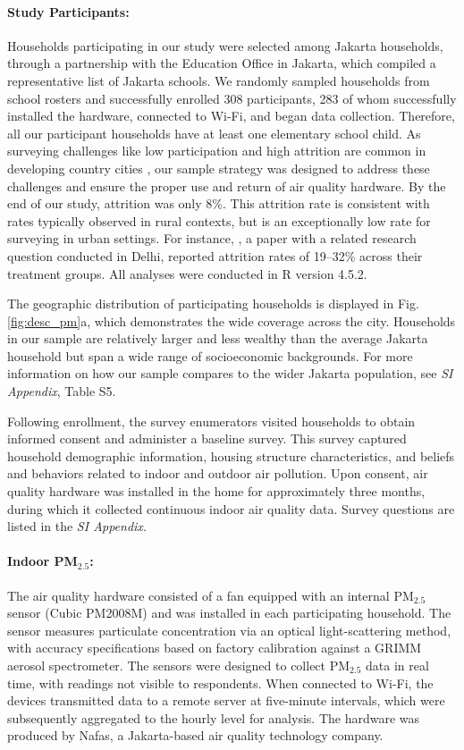\documentclass[9pt,twocolumn,twoside]{pnas-new}
\begin{document}
\paragraph{Study Participants:} Households participating in our study were selected among Jakarta households, through a partnership with the Education Office in Jakarta, which compiled a representative list of Jakarta schools. We randomly sampled households from school rosters and successfully enrolled 308 participants, 283 of whom successfully installed the hardware, connected to Wi-Fi, and began data collection. Therefore, all our participant households have at least one elementary school child. As surveying challenges like low participation and high attrition are common in developing country cities \citep{greenstone_indoor_2021}, our sample strategy was designed to address these challenges and ensure the proper use and return of air quality hardware. By the end of our study, attrition was only 8\%. This attrition rate is consistent with rates typically observed in rural contexts, but is an exceptionally low rate for surveying in urban settings. For instance, \citep{greenstone_indoor_2021}, a paper with a related research question conducted in Delhi, reported attrition rates of 19–32\% across their treatment groups. All analyses were conducted in R version 4.5.2.

The geographic distribution of participating households is displayed in Fig. \ref{fig:desc_pm}a, which demonstrates the wide coverage across the city. Households in our sample are relatively larger and less wealthy than the average Jakarta household but span a wide range of socioeconomic backgrounds. For more information on how our sample compares to the wider Jakarta population, see \textit{SI Appendix}, Table S5.

Following enrollment, the survey enumerators visited households to obtain informed consent and administer a baseline survey. This survey captured household demographic information, housing structure characteristics, and beliefs and behaviors related to indoor and outdoor air pollution. Upon consent, air quality hardware was installed in the home for approximately three months, during which it collected continuous indoor air quality data. Survey questions are listed in the \textit{SI Appendix}.

\paragraph{Indoor PM$_{2.5}$:} The air quality hardware consisted of a fan equipped with an internal PM$_{2.5}$ sensor (Cubic PM2008M) and was installed in each participating household. The sensor measures particulate concentration via an optical light-scattering method, with accuracy specifications based on factory calibration against a GRIMM aerosol spectrometer. 
The sensors were designed to collect PM$_{2.5}$ data in real time, with readings not visible to respondents. When connected to Wi-Fi, the devices transmitted data to a remote server at five-minute intervals, which were subsequently aggregated to the hourly level for analysis. The hardware was produced by Nafas, a Jakarta-based air quality technology company.
\end{document}
